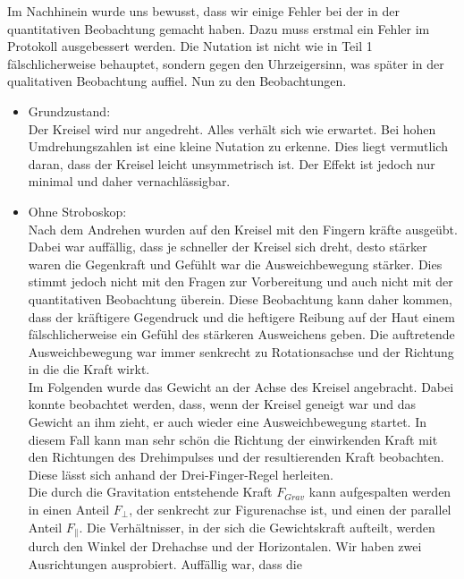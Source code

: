 Im Nachhinein wurde uns bewusst, dass wir einige Fehler bei der in der quantitativen Beobachtung gemacht haben. 
Dazu muss erstmal ein Fehler im Protokoll ausgebessert werden. Die Nutation ist nicht wie in Teil 1 fälschlicherweise 
behauptet, sondern gegen den Uhrzeigersinn, was später in der qualitativen Beobachtung auffiel. Nun zu den Beobachtungen.
\begin{itemize}
    \item Grundzustand:\\
        Der Kreisel wird nur angedreht. Alles verhält sich wie erwartet. Bei hohen Umdrehungszahlen ist eine kleine Nutation zu erkenne. Dies liegt vermutlich daran, dass der Kreisel
        leicht unsymmetrisch ist. Der Effekt ist jedoch nur minimal und daher vernachlässigbar.
    \item Ohne Stroboskop:\\
        Nach dem Andrehen wurden auf den Kreisel mit den Fingern kräfte ausgeübt. Dabei war auffällig, dass je schneller der Kreisel sich dreht, desto stärker waren die Gegenkraft und Gefühlt war die Ausweichbewegung 
        stärker. Dies stimmt jedoch nicht mit den Fragen zur Vorbereitung und auch nicht mit der quantitativen Beobachtung überein. Diese Beobachtung kann daher kommen, 
        dass der kräftigere Gegendruck und die heftigere Reibung auf der Haut einem fälschlicherweise ein Gefühl des stärkeren Ausweichens geben.
        Die auftretende Ausweichbewegung war immer 
        senkrecht zu Rotationsachse und der Richtung in die die Kraft wirkt. \\
        Im Folgenden wurde das Gewicht an der Achse des Kreisel angebracht. Dabei konnte beobachtet werden, dass, wenn der Kreisel geneigt war und das Gewicht an ihm zieht, er auch wieder 
        eine Ausweichbewegung startet. In diesem Fall kann man sehr schön die Richtung der einwirkenden Kraft mit den Richtungen des Drehimpulses und der resultierenden Kraft beobachten.
        Diese lässt sich anhand der Drei-Finger-Regel herleiten.\\
        Die durch die Gravitation entstehende Kraft $F_{Grav}$ kann aufgespalten werden in einen Anteil $F_{\bot}$, der senkrecht zur Figurenachse ist, und einen der parallel Anteil $F_{\| }$. 
        Die Verhältnisser, in der sich die Gewichtskraft aufteilt, werden durch den Winkel der Drehachse und der Horizontalen. Wir haben zwei Ausrichtungen ausprobiert. Auffällig war, dass die 

\end{itemize}
